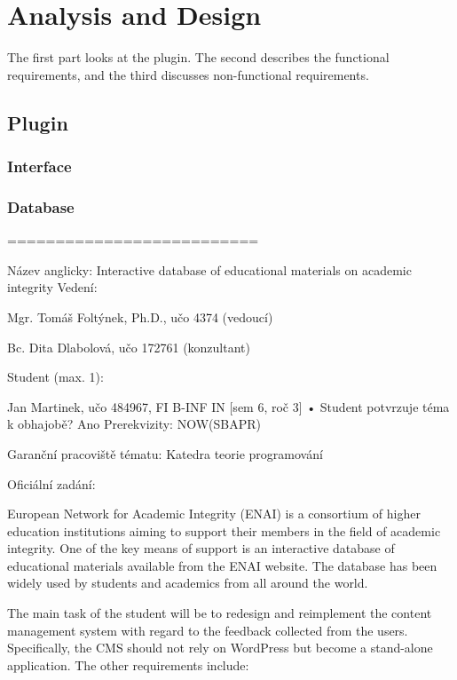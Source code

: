 \documentclass[
  digital,     %
  oneside,     %
  nosansbold,  %
  colorbold, %
  lof,         %
  lot,         %
]{fithesis4}
\begin{document}
\chapter{Analysis and Design}
\label{chap:analysis}

The first part looks at the plugin. The second describes the functional requirements,
and the third discusses \mbox{non-functional} requirements.

\section{Plugin}
\label{sect:plugin}

\subsection{Interface}

\subsection{Database}

\newpage

==========================

Název anglicky: Interactive database of educational materials on academic integrity
Vedení:

Mgr. Tomáš Foltýnek, Ph.D., učo 4374 (vedoucí)   

Bc. Dita Dlabolová, učo 172761 (konzultant)   

Student (max. 1):

Jan Martinek, učo 484967, FI B-INF IN [sem 6, roč 3] • Student potvrzuje téma k obhajobě? Ano
Prerekvizity: NOW(SBAPR)

Garanční pracoviště tématu: Katedra teorie programování

Oficiální zadání:

European Network for Academic Integrity (ENAI) is a consortium of higher education institutions
aiming to support their members in the field of academic integrity. One of the key means of
support is an interactive database of educational materials available from the ENAI website.
The database has been widely used by students and academics from all around the world.

The main task of the student will be to redesign and reimplement the content management
system with regard to the feedback collected from the users. Specifically, the CMS should
not rely on WordPress but become a stand-alone application. The other requirements include:
\end{document}
